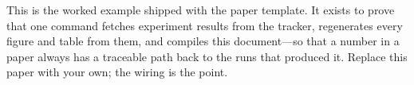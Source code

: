 
This is the worked example shipped with the paper template. It exists to prove
that one command fetches experiment results from the tracker, regenerates every
figure and table from them, and compiles this document---so that a number in a
paper always has a traceable path back to the runs that produced it. Replace
this paper with your own; the wiring is the point.
